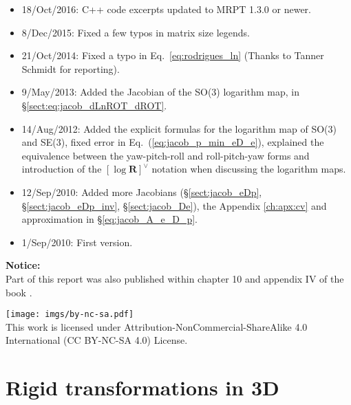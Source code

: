 \documentclass[a4paper,11pt]{report}
\begin{document}
\begin{itemize}
 \item 18/Oct/2016: C++ code excerpts updated to MRPT 1.3.0 or newer.

 \item 8/Dec/2015: Fixed a few typos in matrix size legends.

 \item 21/Oct/2014: Fixed a typo in Eq.~\ref{eq:rodrigues_ln} (Thanks to Tanner Schmidt for reporting).

 \item 9/May/2013: Added the Jacobian of the SO(3) logarithm map, in \S\ref{sect:eq:jacob_dLnROT_dROT}.

 \item 14/Aug/2012: Added the explicit formulas for the logarithm map of SO(3) and SE(3),
    fixed error in Eq.~(\ref{eq:jacob_p_min_eD_e}), explained the equivalence between the yaw-pitch-roll
and roll-pitch-yaw forms and introduction of the $\left[ \log \mathbf{R} \right]^\vee$ notation
when discussing the logarithm maps.

 \item 12/Sep/2010: Added more Jacobians (\S\ref{sect:jacob_eDp},
\S\ref{sect:jacob_eDp_inv}, \S\ref{sect:jacob_De}),
         the Appendix \ref{ch:apx:cv} and approximation in \S\ref{eq:jacob_A_e_D_p}.

 \item 1/Sep/2010: First version.
\end{itemize}


\vfill
\textbf{Notice:} \\

Part of this report was also published within chapter 10 and appendix IV of the
book \cite{madrigal2012slambook}.

\vspace{1cm}

\begin{scriptsize}
\begin{center}
\texttt{[image: imgs/by-nc-sa.pdf]}
\\
This work is licensed under
Attribution-NonCommercial-ShareAlike 4.0 International (CC BY-NC-SA 4.0)
License.
\end{center}

\end{scriptsize}


\newpage

\tableofcontents


\chapter{Rigid transformations in 3D}
\end{document}

